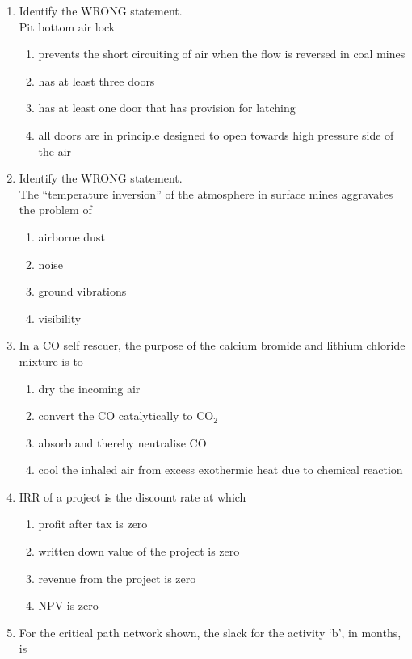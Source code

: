 \documentclass[journal]{IEEEtran}
\begin{document}
\begin{enumerate}
\item Identify the WRONG statement. \\
Pit bottom air lock
  \begin{enumerate}
\item prevents the short circuiting of air when the flow is reversed in coal mines
      \item has at least three doors
      \item has at least one door that has provision for latching
      \item all doors are in principle designed to open towards high pressure side of the air
  \end{enumerate}
  \hfill{}
\item Identify the WRONG statement. \\
The ``temperature inversion'' of the atmosphere in surface mines aggravates the problem of
  \begin{enumerate}
\item airborne dust
      \item noise
      \item ground vibrations
      \item visibility
  \end{enumerate}

  \hfill{}
\item In a CO self rescuer, the purpose of the calcium bromide and lithium chloride mixture is to
  \begin{enumerate}
\item dry the incoming air
      \item convert the CO catalytically to CO$_2$
      \item absorb and thereby neutralise CO
      \item cool the inhaled air from excess exothermic heat due to chemical reaction
  \end{enumerate}
  \hfill{}
\item IRR of a project is the discount rate at which
  \begin{enumerate}
\item profit after tax is zero
      \item written down value of the project is zero
      \item revenue from the project is zero
      \item NPV is zero
  \end{enumerate}
\hfill{}
\item For the critical path network shown, the slack for the activity `b', in months, is


\end{enumerate}
\end{document}
